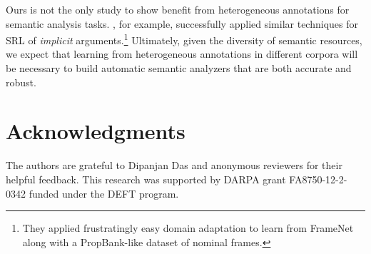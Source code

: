 \documentclass[11pt,a4paper]{article}
\newcommand{\finalversion}[1]{#1}
\begin{document}
Ours is not the only study to show benefit from heterogeneous annotations for semantic analysis tasks.
, for example, successfully applied similar techniques
for SRL of \emph{implicit} arguments.\footnote{They applied frustratingly easy domain adaptation 
to learn from FrameNet along with a PropBank-like dataset of nominal frames.}
Ultimately, given the diversity of semantic resources, 
we expect that learning from heterogeneous annotations in different corpora 
will be necessary to build automatic semantic analyzers that are 
both accurate and robust.

\finalversion{\section*{Acknowledgments}

The authors are grateful to Dipanjan Das and anonymous reviewers for
their helpful feedback.
This research was supported by DARPA grant FA8750-12-2-0342 funded under the
DEFT program.
}

\smaller


\setlength{\bibsep}{1pt}
{\fontsize{10}{12.25}\selectfont
}
\end{document}
